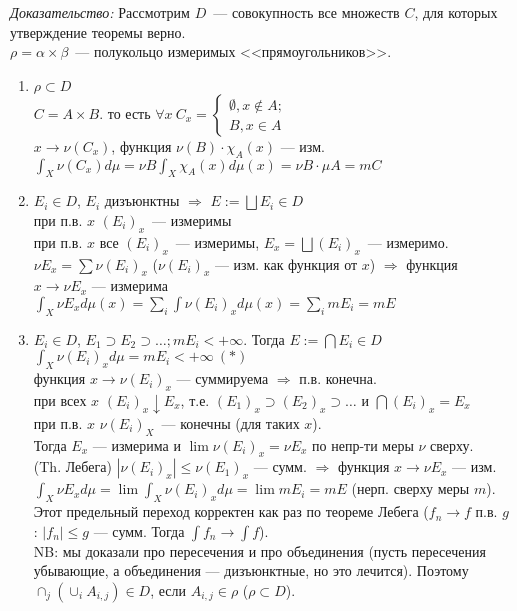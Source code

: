 \documentclass[paper=a4, fontsize=14pt]{report}
\begin{document}
	
\emph{Доказательство:}
		Рассмотрим $D$~--- совокупность все множеств $C$, для которых утверждение теоремы верно.\\
		$\rho = \alpha\times\beta$~--- полукольцо измеримых <<прямоугольников>>.\\
		\begin{enumerate}
			\item
				$\rho \subset D$\\
				$C = A \times B$. то есть $\forall x\ C_x = 
                    \begin{cases}
                        \emptyset, x \not\in A;\\
                        B, x \in A
                    \end{cases}$\\
				$x \rightarrow \nu(C_x)$, функция $\nu(B) \cdot \chi_A(x)$ --- изм.\\
				$\int_X \nu(C_x)d\mu = \nu B \int_X \chi_A(x)d\mu(x) = \nu B \cdot \mu A = m C$
			\item
				$E_i \in D$, $E_i$ дизъюнктны $\Rightarrow$ $E := \bigsqcup E_i \in D$\\
				при п.в. $x$ $(E_i)_x$~--- измеримы\\
				при п.в. $x$ все $(E_i)_x$~--- измеримы, $E_x = \bigsqcup (E_i)_x$~--- измеримо.\\
				$\nu E_x = \sum \nu (E_i)_x$ ($\nu (E_i)_x$ --- изм. как функция от $x$) $\Rightarrow$ функция $ x \rightarrow \nu E_x$ --- измерима\\
				$\int_X \nu E_x d\mu(x) = \sum_{i}\int\nu(E_i)_x d\mu(x) = \sum_{i}m E_i = m E$
			\item
				$E_i \in D$, $E_1 \supset E_2 \supset \ldots ; m E_i < +\infty$. Тогда $E := \bigcap E_i \in D$\\
				$\int_X\nu(E_i)_x d\mu = m E_i < +\infty\ (*)$\\
				функция $x \rightarrow \nu(E_i)_x$ --- суммируема $\Rightarrow$ п.в. конечна.\\
				при всех $x$ $(E_i)_x \downarrow E_x$, т.е. $(E_1)_x \supset (E_2)_x \supset \ldots $ и $\bigcap(E_i)_x = E_x$\\
				при п.в. $x$ $\nu(E_i)_X$~--- конечны (для таких $x$).\\
				Тогда $E_x$ --- измерима и $\lim \nu(E_i)_x = \nu E_x$ по непр-ти меры $\nu$ сверху.\\
				(Th. Лебега) $|\nu(E_i)_x| \leq \nu(E_1)_x$ --- сумм. $\Rightarrow$ функция $x \rightarrow \nu E_x$ --- изм.\\
				$\int_X\nu E_x d\mu = \lim\int_X\nu(E_i)_x d\mu = \lim m E_i = m E$ (нерп. сверху меры $m$). Этот предельный переход корректен как раз по теореме Лебега ($f_n \rightarrow f$ п.в. $g$ : $|f_n| \leq g$ --- сумм. Тогда $\int f_n \rightarrow \int f$).\\
				NB: мы доказали про пересечения и про объединения (пусть пересечения убывающие, а объединения --- дизъюнктные, но это лечится). Поэтому $\cap_j(\cup_i A_{i, j}) \in D$, если $A_{i,j} \in \rho$ ($\rho \subset D$).
				

\end{enumerate}
\end{document}
